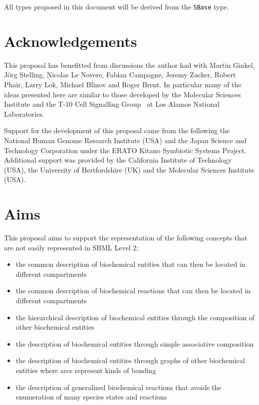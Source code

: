 \documentclass{cekarticle}
\begin{document}
All types proposed in this document will be derived from the
\texttt{SBase} type.


\section{Acknowledgements}

This proposal has benefitted from discussions the author had with
Martin Ginkel, J\"org Stelling, Nicolas Le Novere, Fabian
Campagne, Jeremy Zucker, Robert Phair, Larry Lok, Michael Blinov
and Roger Brent. In particular many of the ideas presented here
are similar to those developed by the Molecular Sciences Institute
and the T-10 Cell Signalling Group~\citep{goldstein:2001} at Los
Alamos National Laboratories.

Support for the development of this proposal came from the
following the National Human Genome Research Institute (USA) and
the Japan Science and Technology Corporation under the ERATO
Kitano Symbiotic Systems Project. Additional support was provided
by the California Institute of Technology (USA), the University of
Hertfordshire (UK) and the Molecular Sciences Institute (USA).

\section{Aims}

This proposal aims to support the representation of the following concepts that are not easily
represented in SBML Level 2:

\begin{itemize}
\item the common description of biochemical entities that can then be located in different
compartments
\item the common description of biochemical reactions that can then be located in different
compartments
\item the hierarchical description of biochemical entities through the composition of other
biochemical entities
\item the description of biochemical entities through simple associative composition
\item the description of biochemical entities through graphs of other biochemical entities
where arcs represent kinds of bonding
\item the description of generalized biochemical reactions that avoids the enumeration of
many species states and reactions
\end{itemize}
\end{document}
